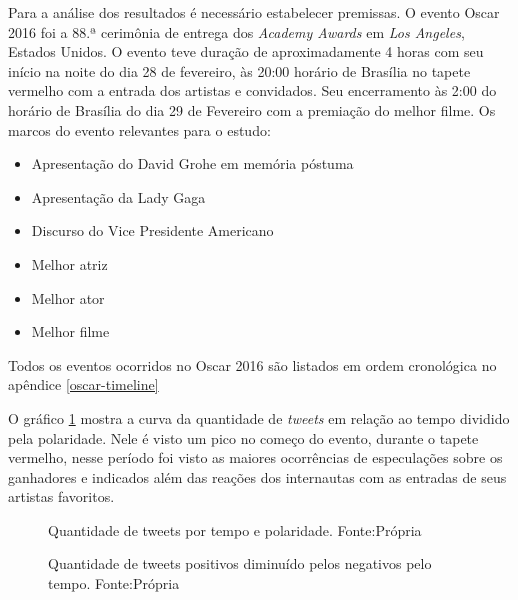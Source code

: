 Para a análise dos resultados é necessário estabelecer premissas. O evento Oscar 2016 foi a  88.ª cerimônia de entrega dos \textit{Academy Awards} em \textit{Los Angeles}, Estados Unidos. O evento teve duração de aproximadamente 4 horas com seu início na noite do dia 28 de fevereiro, às 20:00 horário de Brasília no tapete vermelho com a entrada dos artistas e convidados. Seu encerramento às 2:00 do horário de Brasília do dia 29 de Fevereiro com a premiação do melhor filme. Os marcos do evento relevantes para o estudo: 
\begin{itemize}
	\item Apresentação do David Grohe em memória póstuma
	\item Apresentação da Lady Gaga 
	\item Discurso do Vice Presidente Americano
	\item Melhor atriz
	\item Melhor ator
	\item Melhor filme
\end{itemize}
Todos os eventos ocorridos no Oscar 2016 são listados em ordem cronológica no apêndice \ref{oscar-timeline}

O gráfico \ref{qtd} mostra a curva da quantidade de \textit{tweets} em relação ao tempo  dividido pela polaridade. Nele é visto um pico  no começo do evento, durante o tapete vermelho, nesse período foi visto as maiores ocorrências de especulações sobre os ganhadores e indicados além das reações dos internautas com as entradas de seus artistas favoritos.

\begin{figure}[H]
	\centering{}
	\caption{Quantidade de tweets por tempo e polaridade. Fonte:Própria}
	\label{qtd}
\end{figure}

\begin{figure}[H]
	\centering{}
	\caption{Quantidade de tweets positivos diminuído pelos negativos pelo tempo. Fonte:Própria}
	\label{qtdnegpos}
\end{figure}


